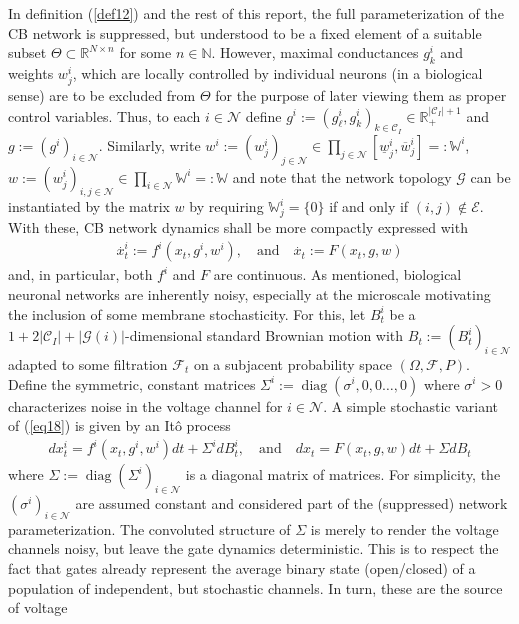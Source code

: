 \documentclass[12pt, oneside]{report}
\newcommand{\mbb}[1]{\mathbb{#1}}
\newcommand{\1}[1]{\mathbbm{1}_{\{#1\}}}
\newcommand{\mc}[1]{\mathcal{#1}}
\newcommand*{\td}[1]{\overset{\bm .}{#1}}
\DeclareMathOperator{\diag}{diag} \DeclareMathOperator{\as}{a.s.}
\theoremstyle{definition}
\begin{document}
In definition (\ref{def12}) and the rest of this report, the full
parameterization of the CB network is suppressed, but understood to be a fixed
element of a suitable subset $\Theta\subset\mbb{R}^{N\times n}$ for some
$n\in\mbb{N}$. However, maximal conductances $g^i_k$ and weights $w^i_j$, which
are locally controlled by individual neurons (in a biological sense) are to be
excluded from $\Theta$ for the purpose of later viewing them as proper control
variables. Thus, to each $i\in\mc{N}$ define
$g^i:=(g^i_\ell,g^i_k)_{k\in\mc{C}_I}\in\mbb{R}_+^{|\mc{C}_I|+1}$ and
$g:=(g^i)_{i\in\mc{N}}$. Similarly, write
$w^i:=(w^i_j)_{j\in\mc{N}}\in\prod_{j\in\mc{N}}[\underline{w}^i_j,\overline{w}^i_j]=:\mbb{W}^i$,
$w:=(w^i_j)_{i,j\in\mc{N}}\in\prod_{i\in\mc{N}}\mbb{W}^i=:\mbb{W}$ and note
that the network topology $\mc{G}$ can be instantiated by the matrix $w$ by
requiring $\mbb{W}^i_j=\{0\}$ if and only if $(i,j)\notin\mc{E}$. With these, CB
network dynamics shall be more compactly expressed with
\begin{align}
    \td{x}^i_t:=f^i(x_t,g^i,w^i),\quad\text{and}\quad \td{x}_t:=F(x_t,g,w)\label{eq18}
\end{align}
and, in particular, both $f^i$ and $F$ are continuous. As mentioned, biological neuronal
networks are inherently noisy, especially at the microscale \cite{Faisal_Selen_Wolpert_2008} motivating the inclusion
of some membrane stochasticity. For this, let $B^i_t$ be a
$1+2|\mc{C}_I|+|\mc{G}(i)|$-dimensional standard Brownian motion with
$B_t:=(B_t^i)_{i\in\mc{N}}$ adapted to some filtration $\mc{F}_t$ on a subjacent
probability space $(\Omega,\mc{F},P)$. Define the symmetric, constant matrices
$\Sigma^i:=\diag(\sigma^i,0,0\dots,0)$ where $\sigma^i>0$ characterizes noise in
the voltage channel for $i\in\mc{N}$. A simple stochastic variant of
(\ref{eq18}) is given by an It\^o process
\begin{align}
    dx^i_t=f^i(x_t,g^i,w^i)dt+\Sigma^idB^i_t,\quad\text{and}\quad dx_t=F(x_t,g,w)dt+\Sigma dB_t\label{eq24}
\end{align}
where $\Sigma:=\diag(\Sigma^i)_{i\in\mc{N}}$ is a diagonal matrix of matrices.
For simplicity, the $(\sigma^i)_{i\in\mc{N}}$ are assumed constant and
considered part of the (suppressed) network parameterization. The convoluted
structure of $\Sigma$ is merely to render the voltage channels noisy, but leave
the gate dynamics deterministic. This is to respect the fact that gates already
represent the average binary state (open/closed) of a population of independent,
but stochastic channels. In turn, these are the source of voltage
\end{document}
